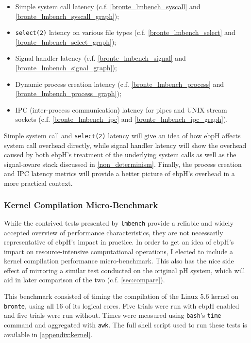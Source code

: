 \documentclass[
  12pt]{findlay}
\newcommand{\passthrough}[1]{#1}
\providecommand{\tightlist}{\setlength{\itemsep}{0pt}\setlength{\parskip}{0pt}}
\begin{document}
\begin{itemize}
\tightlist
\item
  Simple system call latency (c.f. \autoref{bronte_lmbench_syscall} and
  \autoref{bronte_lmbench_syscall_graph});
\item
  \passthrough{\lstinline!select(2)!} latency on various file types
  (c.f. \autoref{bronte_lmbench_select} and
  \autoref{bronte_lmbench_select_graph});
\item
  Signal handler latency (c.f. \autoref{bronte_lmbench_signal} and
  \autoref{bronte_lmbench_signal_graph});
\item
  Dynamic process creation latency (c.f.
  \autoref{bronte_lmbench_process} and
  \autoref{bronte_lmbench_process_graph});
\item
  IPC (inter-process communication) latency for pipes and UNIX stream
  sockets (c.f. \autoref{bronte_lmbench_ipc} and
  \autoref{bronte_lmbench_ipc_graph}).
\end{itemize}

Simple system call and \passthrough{\lstinline!select(2)!} latency will
give an idea of how ebpH affects system call overhead directly, while
signal handler latency will show the overhead caused by both ebpH's
treatment of the underlying system calls as well as the signal-aware
stack discussed in \autoref{non_determinism}. Finally, the process
creation and IPC latency metrics will provide a better picture of ebpH's
overhead in a more practical context.

\hypertarget{kernel-compilation-micro-benchmark}{%
\subsubsection{Kernel Compilation
Micro-Benchmark}\label{kernel-compilation-micro-benchmark}}

While the contrived tests presented by \passthrough{\lstinline!lmbench!}
provide a reliable and widely accepted overview of performance
characteristics, they are not necessarily representative of ebpH's
impact in practice. In order to get an idea of ebpH's impact on
resource-intensive computational operations, I elected to include a
kernel compilation performance micro-benchmark. This also has the nice
side effect of mirroring a similar test conducted on the original pH
system, which will aid in later comparison of the two (c.f.
\autoref{sec:compare}).

This benchmark consisted of timing the compilation of the Linux 5.6
kernel on \passthrough{\lstinline!bronte!}, using all 16 of its logical
cores. Five trials were run with ebpH enabled and five trials were run
without. Times were measured using \passthrough{\lstinline!bash!}'s
\passthrough{\lstinline!time!} command and aggregated with
\passthrough{\lstinline!awk!}. The full shell script used to run these
tests is available in \autoref{appendix:kernel}.
\end{document}
